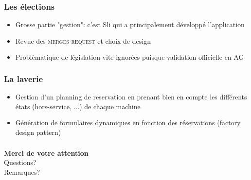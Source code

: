 \documentclass[10pt]{beamer}
\begin{document}
\begin{frame}[fragile]\frametitle{Les élections}
    \begin{itemize}
        \item Grosse partie "gestion": c'est Sli qui a principalement développé l'application
        \item Revue des \textsc{merges request} et choix de design
        \item Problèmatique de législation vite ignorées puisque validation officielle en AG
    \end{itemize}
\end{frame}

\begin{frame}[fragile]\frametitle{La laverie}
    \begin{itemize}
        \item Gestion d'un planning de reservation en prenant bien en compte les différents états (hors-service, ...) de
            chaque machine
        \item Génération de formulaires dynamiques en fonction des réservations (factory design pattern)
    \end{itemize}
\end{frame}

\begin{frame}[fragile]\frametitle{}
    \begin{center}
        \textbf{Merci de votre attention}\\
        Questions?\\
        Remarques?\\
    \end{center}
\end{frame}
\end{document}
